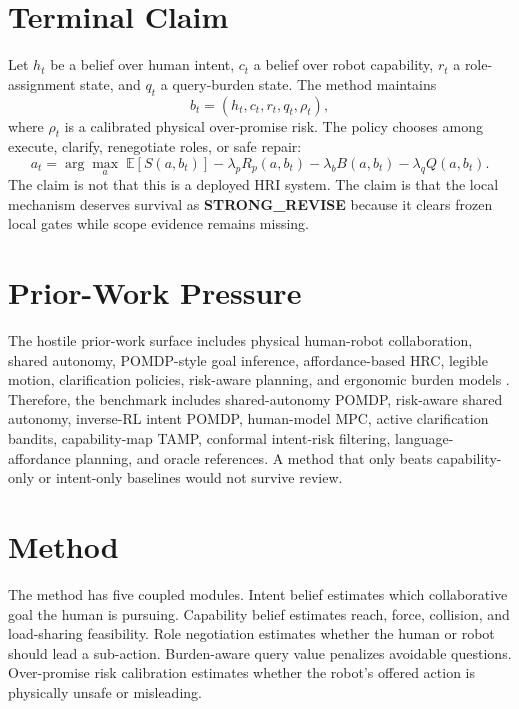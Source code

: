 \documentclass{article}
\begin{document}
\section{Terminal Claim}
Let $h_t$ be a belief over human intent, $c_t$ a belief over robot capability, $r_t$ a role-assignment state, and $q_t$ a query-burden state. The method maintains
\[
  b_t = (h_t, c_t, r_t, q_t, \rho_t),
\]
where $\rho_t$ is a calibrated physical over-promise risk. The policy chooses among execute, clarify, renegotiate roles, or safe repair:
\[
  a_t = \arg\max_a \; \mathbb{E}[S(a,b_t)] - \lambda_p R_p(a,b_t) - \lambda_b B(a,b_t) - \lambda_q Q(a,b_t).
\]
The claim is not that this is a deployed HRI system. The claim is that the local mechanism deserves survival as \textbf{STRONG\_REVISE} because it clears frozen local gates while scope evidence remains missing.

\section{Prior-Work Pressure}
The hostile prior-work surface includes physical human-robot collaboration, shared autonomy, POMDP-style goal inference, affordance-based HRC, legible motion, clarification policies, risk-aware planning, and ergonomic burden models \citep{chang2018effects8,mol2025fitts9,li2022humanaware10,gao2021show11,semeraro2022humanrobot12,romay2017collaborative13,imre2019affordancebased14,wang2023a15,messeri2022a16,losey2018a17,schaefer2016relinquishing18}. Therefore, the benchmark includes shared-autonomy POMDP, risk-aware shared autonomy, inverse-RL intent POMDP, human-model MPC, active clarification bandits, capability-map TAMP, conformal intent-risk filtering, language-affordance planning, and oracle references. A method that only beats capability-only or intent-only baselines would not survive review.

\section{Method}
The method has five coupled modules. Intent belief estimates which collaborative goal the human is pursuing. Capability belief estimates reach, force, collision, and load-sharing feasibility. Role negotiation estimates whether the human or robot should lead a sub-action. Burden-aware query value penalizes avoidable questions. Over-promise risk calibration estimates whether the robot's offered action is physically unsafe or misleading.
\end{document}
